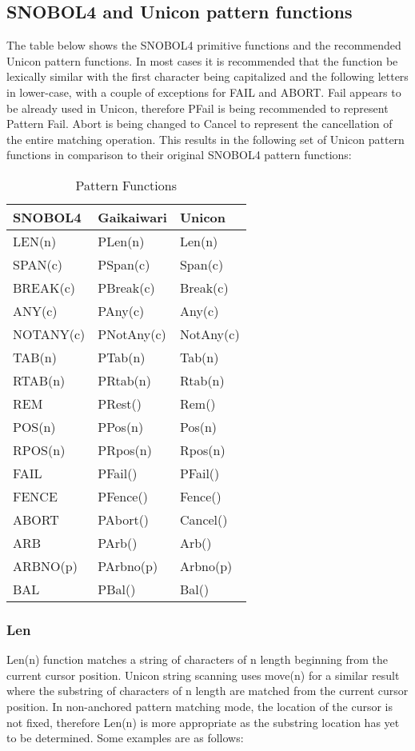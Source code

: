 \documentclass{article}
\begin{document}
\subsection{SNOBOL4 and Unicon pattern functions}

The table below shows the SNOBOL4 primitive functions and the recommended Unicon pattern functions.  In most cases it is recommended that the function be lexically similar with the first character being capitalized and the following letters in lower-case, with a couple of exceptions for FAIL and ABORT.  Fail appears to be already used in Unicon, therefore PFail is being recommended to represent Pattern Fail.  Abort is being changed to Cancel to represent the cancellation of the entire matching operation.  This results in the following set of Unicon pattern functions in comparison to their original SNOBOL4 pattern functions:

\begin{table}[ht]
	\caption{Pattern Functions}
	\centering
	\begin{tabular}{|l|l|l|}
		\hline\hline
		SNOBOL4 & Gaikaiwari & Unicon \\
		\hline
		LEN(n) & PLen(n) & Len(n) \\
		SPAN(c) & PSpan(c) & Span(c)  \\
		BREAK(c) & PBreak(c) & Break(c) \\
		ANY(c) & PAny(c) & Any(c) \\
		NOTANY(c) & PNotAny(c) & NotAny(c) \\
		TAB(n) & PTab(n) & Tab(n) \\
		RTAB(n) & PRtab(n) & Rtab(n) \\
		REM & PRest() & Rem() \\
		POS(n) & PPos(n) & Pos(n)  \\
		RPOS(n) &PRpos(n) & Rpos(n)  \\
		FAIL & PFail() &PFail() \\
		FENCE &PFence() & Fence() \\
		ABORT &PAbort() & Cancel() \\
		ARB & PArb() & Arb() \\
		ARBNO(p) & PArbno(p) & Arbno(p) \\
		BAL & PBal() & Bal() \\
		\hline
	\end{tabular}
\end{table}

\pagebreak
\subsubsection{Len}
Len(n) function matches a string of characters of n length beginning from the current cursor position.  Unicon string scanning uses move(n) for a similar result where the substring of characters of n length are matched from the current cursor position.  In non-anchored pattern matching mode, the location of the cursor is not fixed, therefore Len(n) is more appropriate as the substring location has yet to be determined.  Some examples are as follows: \\
\end{document}
